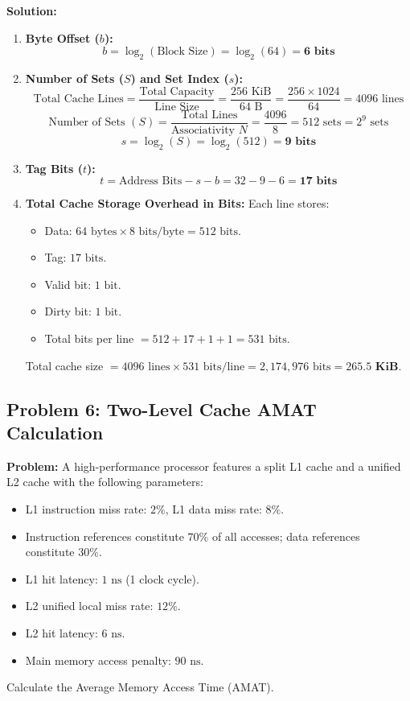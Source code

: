\textbf{Solution:}
\begin{enumerate}[label=\bfseries\alph*.]
    \item \textbf{Byte Offset ($b$):}
    \[ b = \log_2(\text{Block Size}) = \log_2(64) = \mathbf{6\text{ bits}} \]
    \item \textbf{Number of Sets ($S$) and Set Index ($s$):}
    \[ \text{Total Cache Lines} = \frac{\text{Total Capacity}}{\text{Line Size}} = \frac{256\text{ KiB}}{64\text{ B}} = \frac{256 \times 1024}{64} = 4096\text{ lines} \]
    \[ \text{Number of Sets } (S) = \frac{\text{Total Lines}}{\text{Associativity } N} = \frac{4096}{8} = 512\text{ sets} = 2^9\text{ sets} \]
    \[ s = \log_2(S) = \log_2(512) = \mathbf{9\text{ bits}} \]
    \item \textbf{Tag Bits ($t$):}
    \[ t = \text{Address Bits} - s - b = 32 - 9 - 6 = \mathbf{17\text{ bits}} \]
    \item \textbf{Total Cache Storage Overhead in Bits:}
    Each line stores:
    \begin{itemize}
        \item Data: $64\text{ bytes} \times 8\text{ bits/byte} = 512\text{ bits}$.
        \item Tag: $17\text{ bits}$.
        \item Valid bit: $1\text{ bit}$.
        \item Dirty bit: $1\text{ bit}$.
        \item Total bits per line $= 512 + 17 + 1 + 1 = 531\text{ bits}$.
    \end{itemize}
    Total cache size $= 4096\text{ lines} \times 531\text{ bits/line} = 2,174,976\text{ bits} = \mathbf{265.5\text{ KiB}}$.
\end{enumerate}

\subsection{Problem 6: Two-Level Cache AMAT Calculation}
\textbf{Problem:} A high-performance processor features a split L1 cache and a unified L2 cache with the following parameters:
\begin{itemize}
    \item L1 instruction miss rate: $2\%$, L1 data miss rate: $8\%$.
    \item Instruction references constitute $70\%$ of all accesses; data references constitute $30\%$.
    \item L1 hit latency: $1\text{ ns}$ (1 clock cycle).
    \item L2 unified local miss rate: $12\%$.
    \item L2 hit latency: $6\text{ ns}$.
    \item Main memory access penalty: $90\text{ ns}$.
\end{itemize}
Calculate the Average Memory Access Time (AMAT).

